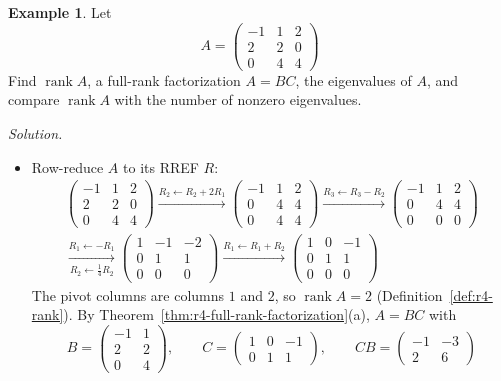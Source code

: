 \documentclass[12pt]{article}
\DeclareMathOperator{\rank}{rank}
\theoremstyle{definition}
\newtheorem{example}[theorem]{Example}
\begin{document}
\begin{example}\label{r7-exm-rank-eigen}
Let
\[
A=\begin{pmatrix}-1&1&2\\2&2&0\\0&4&4\end{pmatrix}
\]
Find \(\rank A\), a full-rank factorization \(A=BC\), the eigenvalues of \(A\), and compare \(\rank A\) with the
number of nonzero eigenvalues.

\textit{Solution.}
\begin{itemize}
\item Row-reduce \(A\) to its RREF \(R\):
\[
\begin{gathered}
\begin{pmatrix}-1&1&2\\2&2&0\\0&4&4\end{pmatrix}
\xrightarrow{R_2\leftarrow R_2+2R_1}
\begin{pmatrix}-1&1&2\\0&4&4\\0&4&4\end{pmatrix}
\xrightarrow{R_3\leftarrow R_3-R_2}
\begin{pmatrix}-1&1&2\\0&4&4\\0&0&0\end{pmatrix}
\\
\xrightarrow[R_2\leftarrow\frac14R_2]{R_1\leftarrow-R_1}
\begin{pmatrix}1&-1&-2\\0&1&1\\0&0&0\end{pmatrix}
\xrightarrow{R_1\leftarrow R_1+R_2}
\begin{pmatrix}1&0&-1\\0&1&1\\0&0&0\end{pmatrix}
\end{gathered}
\]
The pivot columns are columns \(1\) and \(2\), so \(\rank A=2\) (Definition~\ref{def:r4-rank}). By
Theorem~\ref{thm:r4-full-rank-factorization}(a), \(A=BC\) with
\[
B=\begin{pmatrix}-1&1\\2&2\\0&4\end{pmatrix},\qquad C=\begin{pmatrix}1&0&-1\\0&1&1\end{pmatrix},\qquad
CB=\begin{pmatrix}-1&-3\\2&6\end{pmatrix}
\]
\end{itemize}
\end{example}
\end{document}
